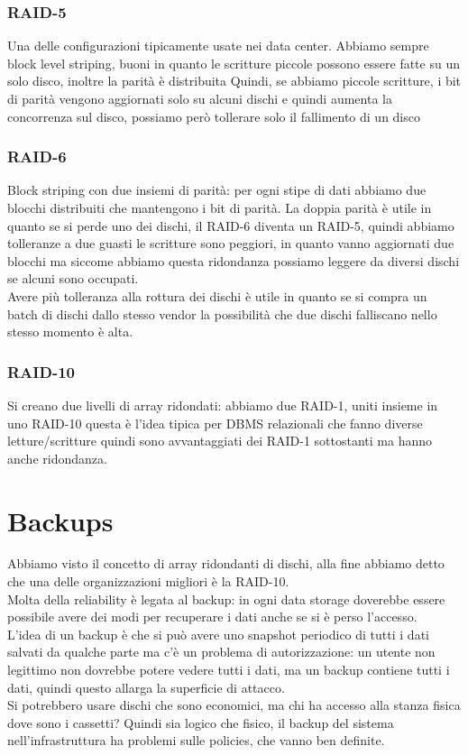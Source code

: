\documentclass[12pt, oneside]{extbook} %
\begin{document}
\subsubsection{RAID-5}
Una delle configurazioni tipicamente usate nei data center. Abbiamo sempre block level striping, buoni in quanto le scritture piccole possono essere fatte su un solo disco, inoltre la parità è distribuita
Quindi, se abbiamo piccole scritture, i bit di parità vengono aggiornati solo su alcuni dischi e quindi aumenta la concorrenza sul disco, possiamo però tollerare solo il fallimento di un disco
\subsubsection{RAID-6}
Block striping con due insiemi di parità: per ogni stipe di dati abbiamo due blocchi distribuiti che mantengono i bit di parità. La doppia parità è utile in quanto se si perde uno dei dischi, il RAID-6 diventa un RAID-5, quindi abbiamo tolleranze a due guasti
le scritture sono peggiori, in quanto vanno aggiornati due blocchi ma siccome abbiamo questa ridondanza possiamo leggere da diversi dischi se alcuni sono occupati.\\Avere più tolleranza alla rottura dei dischi è utile in quanto se si compra un batch di dischi dallo stesso vendor la possibilità che due dischi falliscano nello stesso momento è alta.
\subsubsection{RAID-10}
Si creano due livelli di array ridondati: abbiamo due RAID-1, uniti insieme in uno RAID-10
questa è l'idea tipica per DBMS relazionali che fanno diverse letture/scritture quindi sono avvantaggiati dei RAID-1 sottostanti ma hanno anche ridondanza.
\section{Backups}
Abbiamo visto il concetto di array ridondanti di dischi, alla fine abbiamo detto che una delle organizzazioni migliori è la RAID-10.\\Molta della reliability è legata al backup: in ogni data storage doverebbe essere possibile avere dei modi per recuperare i dati anche se si è perso l'accesso.\\L'idea di un backup è che si può avere uno snapshot periodico di tutti i dati salvati da qualche parte ma c'è un problema di autorizzazione: un utente non legittimo non dovrebbe potere vedere tutti i dati, ma un backup contiene tutti i dati, quindi questo allarga la superficie di attacco.\\Si potrebbero usare dischi che sono economici, ma chi ha accesso alla stanza fisica dove sono i cassetti? Quindi sia logico che fisico, il backup del sistema nell'infrastruttura ha problemi sulle policies, che vanno ben definite.
\end{document}

